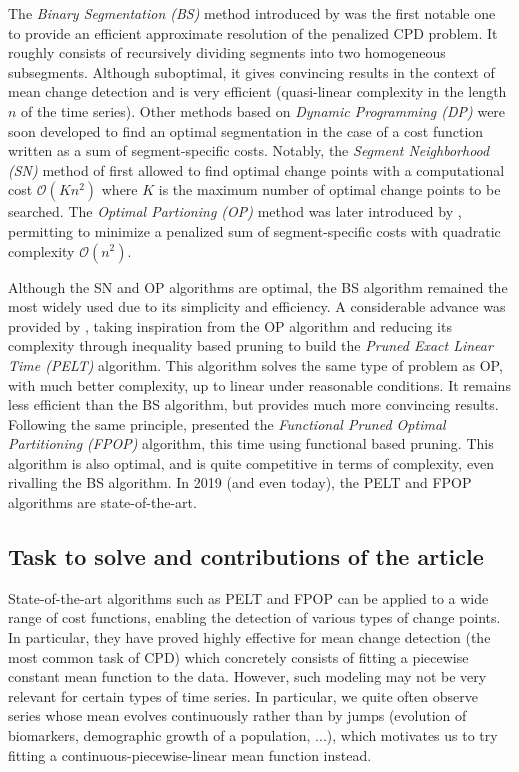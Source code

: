 \documentclass[11pt]{article}
\begin{document}
The \textit{Binary Segmentation (BS)} method introduced by \textcite{scott1974} was the first notable one to provide an efficient approximate resolution of the penalized CPD problem. It roughly consists of recursively dividing segments into two homogeneous subsegments. Although suboptimal, it gives convincing results in the context of mean change detection and is very efficient (quasi-linear complexity in the length $n$ of the time series). Other methods based on \textit{Dynamic Programming (DP)} were soon developed to find an optimal segmentation in the case of a cost function written as a sum of segment-specific costs. Notably, the \textit{Segment Neighborhood (SN)} method of \textcite{auger1989} first allowed to find optimal change points with a computational cost $\mathcal{O}(Kn^2)$ where $K$ is the maximum number of optimal change points to be searched. The \textit{Optimal Partioning (OP)} method was later introduced by \textcite{jackson2005}, permitting to minimize a penalized sum of segment-specific costs with quadratic complexity $\mathcal{O}(n^2)$. 

Although the SN and OP algorithms are optimal, the BS algorithm remained the most widely used due to its simplicity and efficiency. A considerable advance was provided by \textcite{killick2012}, taking inspiration from the OP algorithm and reducing its complexity through inequality based pruning to build the \textit{Pruned Exact Linear Time (PELT)} algorithm. This algorithm solves the same type of problem as OP, with much better complexity, up to linear under reasonable conditions. It remains less efficient than the BS algorithm, but provides much more convincing results. Following the same principle, \textcite{maidstone2017} presented the \textit{Functional Pruned Optimal Partitioning (FPOP)} algorithm, this time using functional based pruning. This algorithm is also optimal, and is quite competitive in terms of complexity, even rivalling the BS algorithm. In 2019 (and even today), the PELT and FPOP algorithms are state-of-the-art. 

\subsection{Task to solve and contributions of the article}

State-of-the-art algorithms such as PELT and FPOP can be applied to a wide range of cost functions, enabling the detection of various types of change points. In particular, they have proved highly effective for mean change detection (the most common task of CPD) which concretely consists of fitting a piecewise constant mean function to the data. However, such modeling may not be very relevant for certain types of time series. In particular, we quite often observe series whose mean evolves continuously rather than by jumps (evolution of biomarkers, demographic growth of a population, ...), which motivates us to try fitting a continuous-piecewise-linear mean function instead. 
\end{document}
